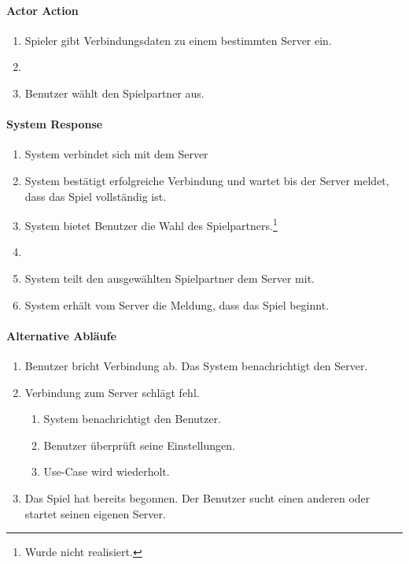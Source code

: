 \documentclass[12pt,halfparskip]{scrartcl}
\begin{document}
\begin{multicols}{2}
\raggedcolumns
\paragraph{Actor Action}
\begin{enumerate}
	\item[1] Spieler gibt Verbindungsdaten zu einem bestimmten Server ein.
	\item[] \vspace{4 \lineheight}
	\item[5] Benutzer wählt den Spielpartner aus.
\end{enumerate}
\columnbreak
\paragraph{System Response}
\begin{enumerate}
	\item[2] System verbindet sich mit dem Server
	\item[3] System bestätigt erfolgreiche Verbindung und wartet bis der Server meldet, dass das Spiel vollständig ist.
	\item[4] System bietet Benutzer die Wahl des Spielpartners.\footnote{Wurde nicht realisiert.}
	\item[] \vspace{1 \lineheight}	
	\item[6] System teilt den ausgewählten Spielpartner dem Server mit.
	\item[7] System erhält vom Server die Meldung, dass das Spiel beginnt.
\end{enumerate}
\end{multicols}
\paragraph{Alternative Abläufe}
\begin{enumerate}
	\item[*a] Benutzer bricht Verbindung ab.\newline
	Das System benachrichtigt den Server.
	\item[2a] Verbindung zum Server schlägt fehl.
	\begin{enumerate}
		\item System benachrichtigt den Benutzer.
		\item Benutzer überprüft seine Einstellungen.
		\item Use-Case wird wiederholt.
	\end{enumerate}
	\item[2b] Das Spiel hat bereits begonnen.\newline
	Der Benutzer sucht einen anderen oder startet seinen eigenen Server.
\end{enumerate}
\end{document}
